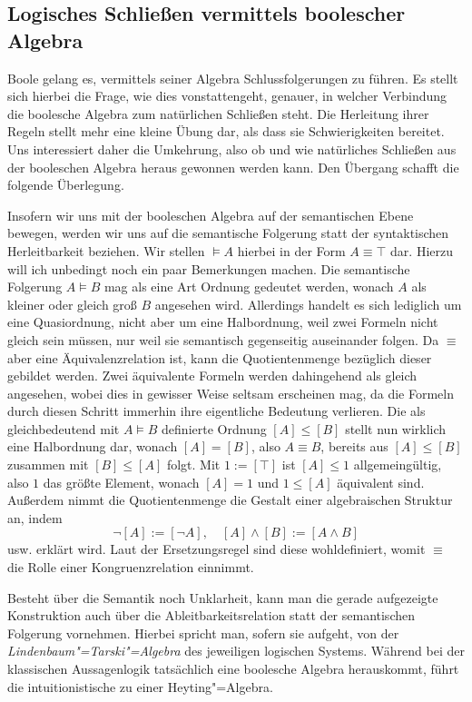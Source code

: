 \subsection{Logisches Schließen vermittels boolescher Algebra}

Boole gelang es, vermittels seiner Algebra Schlussfolgerungen zu führen.
Es stellt sich hierbei die Frage, wie dies vonstattengeht, genauer,
in welcher Verbindung die boolesche Algebra zum natürlichen Schließen
steht. Die Herleitung ihrer Regeln stellt mehr eine kleine Übung dar,
als dass sie Schwierigkeiten bereitet. Uns interessiert daher die
Umkehrung, also ob und wie natürliches Schließen aus der booleschen
Algebra heraus gewonnen werden kann. Den Übergang schafft die folgende
Überlegung.

Insofern wir uns mit der booleschen Algebra auf der semantischen Ebene
bewegen, werden wir uns auf die semantische Folgerung statt der
syntaktischen Herleitbarkeit beziehen. Wir stellen $\models A$ hierbei
in der Form $A\equiv\top$ dar. Hierzu will ich unbedingt noch ein paar
Bemerkungen machen. Die semantische Folgerung $A\models B$ mag als
eine Art Ordnung gedeutet werden, wonach $A$ als kleiner oder gleich groß
$B$ angesehen wird. Allerdings handelt es sich lediglich um eine
Quasiordnung, nicht aber um eine Halbordnung, weil zwei Formeln nicht
gleich sein müssen, nur weil sie semantisch gegenseitig auseinander
folgen. Da $\equiv$ aber eine Äquivalenzrelation ist, kann die
Quotientenmenge bezüglich dieser gebildet werden.
Zwei äquivalente Formeln werden dahingehend als gleich
angesehen, wobei dies in gewisser Weise seltsam erscheinen mag, da
die Formeln durch diesen Schritt immerhin ihre eigentliche Bedeutung
verlieren. Die als gleichbedeutend mit $A\models B$ definierte
Ordnung $[A]\le [B]$ stellt nun wirklich eine Halbordnung dar,
wonach $[A]=[B]$, also $A\equiv B$, bereits aus $[A]\le [B]$ zusammen
mit $[B]\le [A]$ folgt. Mit $1:=[\top]$ ist $[A]\le 1$ allgemeingültig,
also $1$ das größte Element, wonach $[A]=1$ und $1\le [A]$ äquivalent sind.
Außerdem nimmt die Quotientenmenge die Gestalt einer algebraischen
Struktur an, indem%
\[\lnot [A] := [\lnot A],\quad [A]\land [B] := [A\land B]\]
usw. erklärt wird. Laut der Ersetzungsregel sind diese wohldefiniert,
womit $\equiv$ die Rolle einer Kongruenzrelation einnimmt.

Besteht über die Semantik noch Unklarheit, kann man die gerade aufgezeigte
Konstruktion auch über die Ableitbarkeitsrelation statt der semantischen
Folgerung vornehmen. Hierbei spricht man, sofern sie aufgeht, von der
\emph{Lindenbaum"=Tarski"=Algebra} des
jeweiligen logischen Systems. Während bei der klassischen Aussagenlogik
tatsächlich eine boolesche Algebra herauskommt, führt die intuitionistische
zu einer Heyting"=Algebra.

